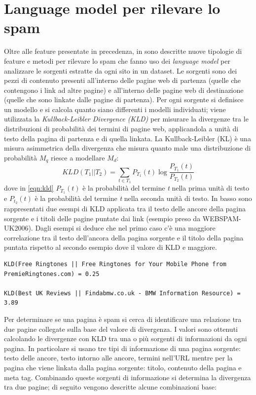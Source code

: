 \section{Language model per rilevare lo spam}
Oltre alle feature presentate in precedenza, in \cite{Martinez-Romo:2009:WSI:1531914.1531920} sono descritte nuove tipologie di feature e metodi per rilevare lo spam che fanno uso dei \textit{language model}  per analizzare le sorgenti estratte da ogni sito in un dataset. Le sorgenti sono dei pezzi di contenuto presenti all'interno delle pagine web di partenza (quelle che contengono i link ad altre pagine) e all'interno delle pagine web di destinazione (quelle che sono linkate dalle pagine di partenza). Per ogni sorgente si definisce un modello e si calcola quanto siano differenti i modelli individuati; viene utilizzata la \textit{Kullback-Leibler Divergence (KLD)} per misurare la divergenze tra le distribuzioni di probabilità dei termini di pagine web, applicandola a unità di testo della pagina di partenza e di quella linkata. La Kullback-Leibler (KL) è una misura  asimmetrica della divergenza che misura quanto male una distribuzione di probabilità \(M_q\) riesce a modellare \(M_d\):
\begin{equation}
KLD(T_1||T_2) = \sum_{t \in T_1} P_{T_1}(t) \log \frac{P_{T_1}(t)}{P_{T_2}(t)}
\label{eqn:kld}
\end{equation}
dove in \ref{eqn:kld} \(P_{T_1}(t)\) è la probabilità del termine \textit{t} nella prima unità di testo e \(P_{t_2}(t)\) è la probabilità del termine \textit{t} nella seconda unità di testo. In basso sono rappresentati due esempi di KLD applicata tra il testo delle ancore della pagina sorgente e i titoli delle pagine puntate dai link (esempio preso da WEBSPAM-UK2006). Dagli esempi si deduce che nel primo caso c'è una maggiore correlazione tra il testo dell'ancora della pagina sorgente e il titolo della pagina puntata rispetto al secondo esempio dove il valore di KLD e maggiore.
\begin{lstlisting}[frame=trbl,postbreak=\space, breakindent=5pt, breaklines]
KLD(Free Ringtones || Free Ringtones for Your Mobile Phone from PremieRingtones.com) = 0.25

KLD(Best UK Reviews || Findabmw.co.uk - BMW Information Resource) = 3.89
\end{lstlisting}
Per determinare se una pagina è spam si cerca di identificare una relazione tra due pagine collegate sulla base del valore di divergenza. I valori sono ottenuti calcolando le divergenze con KLD tra una o più sorgenti di informazioni da ogni pagina. In particolare si usano tre tipi di informazione di una pagina sorgente: testo delle ancore, testo intorno alle ancore, termini nell'URL mentre per la pagina che viene linkata dalla pagina sorgente: titolo, contenuto della pagina e meta tag. Combinando queste sorgenti di informazione si determina la divergenza tra due pagine; di seguito vengono descritte alcune combinazioni base:
